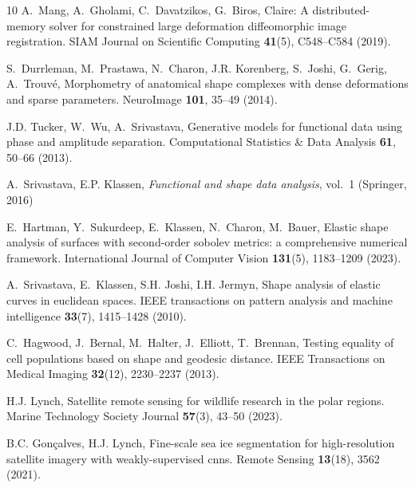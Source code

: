 \documentclass[pdflatex,iicol]{sn-jnl}%
\theoremstyle{thmstyleone}%
\theoremstyle{thmstyletwo}%
\theoremstyle{thmstylethree}%
\begin{document}
\begin{thebibliography}{10}
A.~Mang, A.~Gholami, C.~Davatzikos, G.~Biros, Claire: A distributed-memory solver for constrained large deformation diffeomorphic image registration.
\newblock SIAM Journal on Scientific Computing \textbf{41}(5), C548--C584 (2019).
\newblock {}

S.~Durrleman, M.~Prastawa, N.~Charon, J.R. Korenberg, S.~Joshi, G.~Gerig, A.~Trouv{\'e}, Morphometry of anatomical shape complexes with dense deformations and sparse parameters.
\newblock NeuroImage \textbf{101}, 35--49 (2014).
\newblock {}

J.D. Tucker, W.~Wu, A.~Srivastava, Generative models for functional data using phase and amplitude separation.
\newblock Computational Statistics \& Data Analysis \textbf{61}, 50--66 (2013).
\newblock {}

A.~Srivastava, E.P. Klassen, \emph{Functional and shape data analysis}, vol.~1 (Springer, 2016)

E.~Hartman, Y.~Sukurdeep, E.~Klassen, N.~Charon, M.~Bauer, Elastic shape analysis of surfaces with second-order sobolev metrics: a comprehensive numerical framework.
\newblock International Journal of Computer Vision \textbf{131}(5), 1183--1209 (2023).
\newblock {}

A.~Srivastava, E.~Klassen, S.H. Joshi, I.H. Jermyn, Shape analysis of elastic curves in euclidean spaces.
\newblock IEEE transactions on pattern analysis and machine intelligence \textbf{33}(7), 1415--1428 (2010).
\newblock {}

C.~Hagwood, J.~Bernal, M.~Halter, J.~Elliott, T.~Brennan, Testing equality of cell populations based on shape and geodesic distance.
\newblock IEEE Transactions on Medical Imaging \textbf{32}(12), 2230--2237 (2013).
\newblock {}

H.J. Lynch, Satellite remote sensing for wildlife research in the polar regions.
\newblock Marine Technology Society Journal \textbf{57}(3), 43--50 (2023).
\newblock {}

B.C. Gon{\c{c}}alves, H.J. Lynch, Fine-scale sea ice segmentation for high-resolution satellite imagery with weakly-supervised cnns.
\newblock Remote Sensing \textbf{13}(18), 3562 (2021).
\newblock {}


\end{thebibliography}
\end{document}
